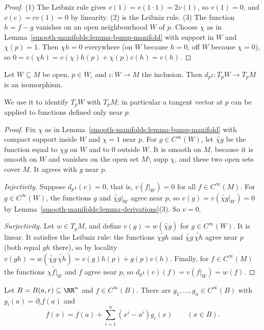 \begin{proof}
(1) The Leibniz rule gives $v(1) = v(1 \cdot 1) = 2v(1)$, so $v(1) = 0$, and $v(c) = cv(1) = 0$ by linearity. (2) is the Leibniz rule. (3) The function
$h = f - g$ vanishes on an open neighbourhood $W$ of $p$. Choose $\chi$ as in Lemma~\ref{smooth-manifolds:lemma-bump-manifold} with support in $W$ and
$\chi(p) = 1$. Then $\chi h = 0$ everywhere (on $W$ because $h = 0$, off $W$ because $\chi = 0$), so
$0 = v(\chi h) = v(\chi)h(p) + \chi(p)v(h) = v(h)$.
\end{proof}

\begin{proposition}\label{smooth-manifolds:proposition-tangent-open}
Let $W \subseteq M$ be open, $p \in W$, and $\iota \colon W \to M$ the inclusion. Then $d_p\iota \colon T_pW \to T_pM$ is an isomorphism.
\end{proposition}

We use it to identify $T_pW$ with $T_pM$; in particular a tangent vector at $p$ can be applied to functions defined only near $p$.

\begin{proof}
Fix $\chi$ as in Lemma~\ref{smooth-manifolds:lemma-bump-manifold} with compact support inside $W$ and $\chi = 1$ near $p$. For $g \in C^\infty(W)$, let
$\widetilde{\chi g}$ be the function equal to $\chi g$ on $W$ and to $0$ outside $W$. It is smooth on $M$, because it is smooth on $W$ and vanishes on the open
set $M \setminus \operatorname{supp}\chi$, and these two open sets cover $M$. It agrees with $g$ near $p$.

\emph{Injectivity.} Suppose $d_p\iota(v) = 0$, that is, $v(f|_W) = 0$ for all $f \in C^\infty(M)$. For $g \in C^\infty(W)$, the functions $g$ and
$\widetilde{\chi g}|_W$ agree near $p$, so $v(g) = v(\widetilde{\chi g}|_W) = 0$ by Lemma~\ref{smooth-manifolds:lemma-derivations}(3). So $v = 0$.

\emph{Surjectivity.} Let $w \in T_pM$, and define $v(g) = w(\widetilde{\chi g})$ for $g \in C^\infty(W)$. It is linear. It satisfies the Leibniz rule: the
functions $\widetilde{\chi gh}$ and $\widetilde{\chi g}\,\widetilde{\chi h}$ agree near $p$ (both equal $gh$ there), so by locality
$v(gh) = w(\widetilde{\chi g}\,\widetilde{\chi h}) = v(g)h(p) + g(p)v(h)$. Finally, for $f \in C^\infty(M)$ the functions $\widetilde{\chi f|_W}$ and $f$ agree
near $p$, so $d_p\iota(v)(f) = v(f|_W) = w(f)$.
\end{proof}

\begin{lemma}[Hadamard]\label{smooth-manifolds:lemma-hadamard}
Let $B = B(a, r) \subseteq \RR^n$ and $f \in C^\infty(B)$. There are $g_1, \ldots, g_n \in C^\infty(B)$ with $g_i(a) = \partial_if(a)$ and
\[
f(x) = f(a) + \sum_{i=1}^n(x^i - a^i)g_i(x) \qquad (x \in B).
\]
\end{lemma}

